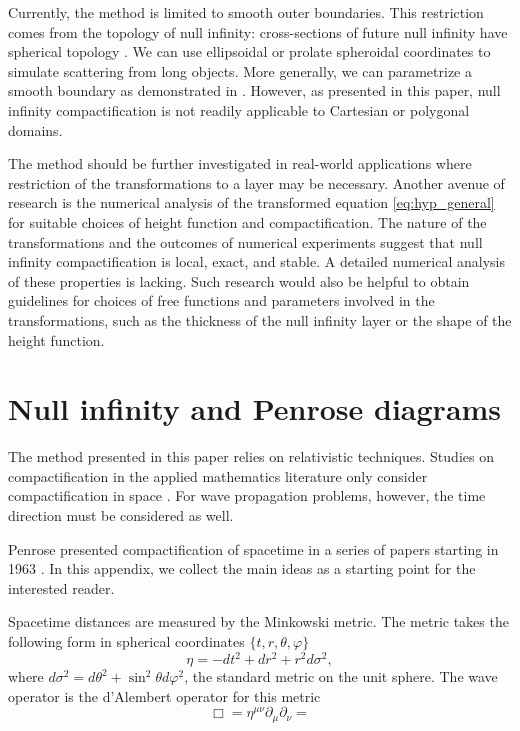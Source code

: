 \documentclass[draft,onefignum,onetabnum]{siamart190516}
\begin{document}
Currently, the method is limited to smooth outer boundaries. This restriction comes from the topology of null infinity: cross-sections of future null infinity have spherical topology \cite{Penrose65, Geroch}. We can use ellipsoidal or prolate spheroidal coordinates to simulate scattering from long objects. More generally, we can parametrize a smooth boundary as demonstrated in \cite{yang2021truly}. However, as presented in this paper, null infinity compactification is not readily applicable to Cartesian or polygonal domains.

The method should be further investigated in real-world applications where restriction of the transformations to a layer may be necessary. Another avenue of research is the numerical analysis of the transformed equation \eqref{eq:hyp_general} for suitable choices of height function and compactification. The nature of the transformations and the outcomes of numerical experiments suggest that null infinity compactification is local, exact, and stable. A detailed numerical analysis of these properties is lacking. Such research would also be helpful to obtain guidelines for choices of free functions and parameters involved in the transformations, such as the thickness of the null infinity layer or the shape of the height function.

\appendix

\section{Null infinity and Penrose diagrams}
\label{sec:app_penrose}
The method presented in this paper relies on relativistic techniques. Studies on compactification in the applied mathematics literature only consider compactification in space \cite{GroschOrszag77, boyd1982optimization, shen2009some}. For wave propagation problems, however, the time direction must be considered as well. 

Penrose presented compactification of spacetime in a series of papers starting in 1963 \cite{Penrose, Penrose65}. In this appendix, we collect the main ideas as a starting point for the interested reader. 

Spacetime distances are measured by the Minkowski metric. The metric takes the following form in spherical coordinates $\{t,r,\theta,\varphi\}$
\[ \eta  = -dt^2 + dr^2  + r^2 d\sigma^2, \]
where $d\sigma^2 = d\theta^2 + \sin^2\theta d\varphi^2$, the standard metric on the unit sphere. The wave operator is the d'Alembert operator for this metric
\[ \Box = \eta^{\mu\nu} \partial_\mu \partial_\nu =  \]
\end{document}
